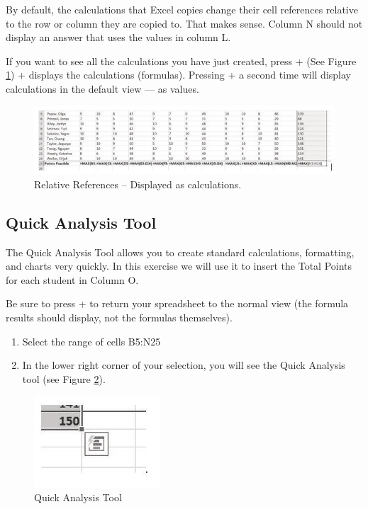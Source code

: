 By default, the calculations that Excel copies change their cell references relative to the row or column they are copied to. That makes sense. Column N should not display an answer that uses the values in column L.

If you want to see all the calculations you have just created, press  + \keystroke{$ \sim $} (See Figure \ref{03:fig03})  + \keystroke{$ \sim $} displays the calculations (formulas). Pressing  + \keystroke{$ \sim $} a second time will display calculations in the default view --- as values.

\begin{figure}[H]
	\centering
	\includegraphics[width=\maxwidth{.95\linewidth}]{gfx/ch03_fig03}
	\caption{Relative References – Displayed as calculations.}
	\label{03:fig03}
\end{figure}

\subsection{Quick Analysis Tool}

The Quick Analysis Tool allows you to create standard calculations, formatting, and charts very quickly. In this exercise we will use it to insert the Total Points for each student in Column O.

Be sure to press  + \keystroke{$ \sim $} to return your spreadsheet to the normal view (the formula results should display, not the formulas themselves).

\begin{enumerate}
	\item Select the range of cells \textsf{B5:N25}
	\item In the lower right corner of your selection, you will see the Quick Analysis tool (see Figure \ref{03:fig04}).
\end{enumerate}

\begin{figure}[H]
	\centering
	\includegraphics[width=\maxwidth{.95\linewidth}]{gfx/ch03_fig04}
	\caption{Quick Analysis Tool}
	\label{03:fig04}
\end{figure}


